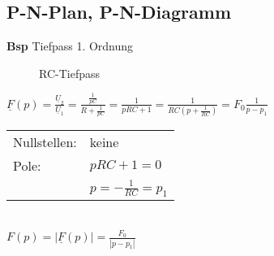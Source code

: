 \subsection{P-N-Plan, P-N-Diagramm}
\textbf{Bsp} Tiefpass 1. Ordnung\\
\begin{wrapfigure}{r}{0.5\textwidth}

\caption[RC-Tiefpass]{RC-Tiefpass}
\label{fig:RCTiefpass}
\end{wrapfigure}
$\underline{F}(p)=\frac{\underline{U}_2}{\underline{U}_1}=\frac{\frac{1}{pC}}{R+\frac{1}{pC}}=\frac{1}{pRC+1}
=\frac{1}{RC\left(p+\frac{1}{RC}\right)}=F_0\frac{1}{p-p_1}$\\
\begin{tabular}{ll}
Nullstellen: & keine\\
Pole: & $pRC+1=0$ \\
& $p=-\frac{1}{RC}=p_1$\\
\end{tabular}\\
$F(p)=|\underline{F}(p)|=\frac{F_0}{|p-p_1|}$\\

